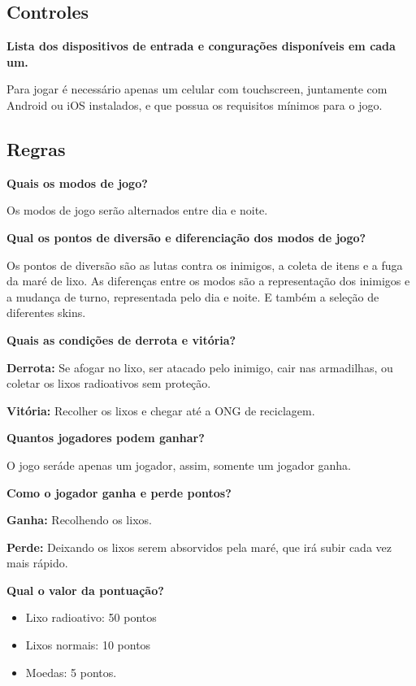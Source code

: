 \documentclass[]{scrartcl}
\begin{document}
\subsection{Controles}

\noindent\textbf{Lista dos dispositivos de entrada e congurações disponíveis em cada um.}

Para jogar é necessário apenas um celular com touchscreen, juntamente com Android ou iOS instalados, e que possua os requisitos mínimos para o jogo.

\subsection{Regras}

\noindent\textbf{Quais os modos de jogo?}

Os modos de jogo serão alternados entre dia e noite.

\noindent\textbf{Qual os pontos de diversão e diferenciação dos modos de jogo?}

Os pontos de diversão são as lutas contra os inimigos, a coleta de itens e a fuga da maré de lixo. As diferenças entre os modos são a representação dos inimigos e a mudança de turno, representada pelo dia e noite. E também a seleção de diferentes skins.

\noindent\textbf{Quais as condições de derrota e vitória?}

\textbf{Derrota:} Se afogar no lixo, ser atacado pelo inimigo, cair nas armadilhas, ou coletar os lixos radioativos sem proteção.

\textbf{Vitória:} Recolher os lixos e chegar até a ONG de reciclagem.

\noindent\textbf{Quantos jogadores podem ganhar?}

O jogo seráde  apenas um jogador, assim, somente um jogador ganha.

\noindent\textbf{Como o jogador ganha e perde pontos?}

\textbf{Ganha:} Recolhendo os lixos. 

\textbf{Perde:} Deixando os lixos serem absorvidos pela maré, que irá subir cada vez mais rápido.

\noindent\textbf{Qual o valor da pontuação?}

\begin{itemize}
    \item Lixo radioativo: 50 pontos
    \item Lixos normais: 10 pontos
    \item Moedas: 5 pontos.
\end{itemize}
\end{document}
